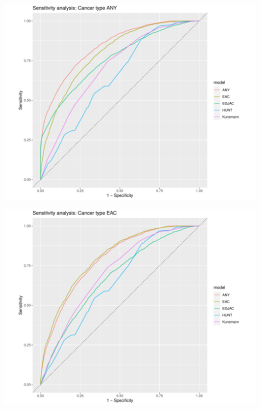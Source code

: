 \documentclass[12pt]{article}
\begin{document}
\begin{center}
\includegraphics[width=\textwidth]{sensitivity_cancertype/roc_curves_ANY_model.pdf}
\end{center}
\begin{center}
\includegraphics[width=\textwidth]{sensitivity_cancertype/roc_curves_EAC_model.pdf}
\end{center}
\end{document}
